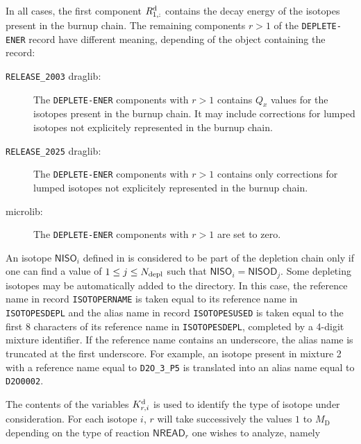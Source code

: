 In all cases, the first component $R_{1,:}^{\rm d}$ contains the decay energy of the isotopes present in the burnup chain. The remaining components $r>1$ of the {\tt DEPLETE-ENER} record have different meaning, depending of the object containing the record:
\begin{description}
\item[{\tt RELEASE\_2003} draglib:] The {\tt DEPLETE-ENER} components with $r>1$ contains $Q_x$ values for the isotopes present in the burnup chain. It may include corrections for lumped isotopes not explicitely represented in the burnup chain.
\item[{\tt RELEASE\_2025} draglib:] The {\tt DEPLETE-ENER} components with $r>1$ contains only corrections for lumped isotopes not explicitely represented in the burnup chain.
\item[microlib:] The {\tt DEPLETE-ENER} components with $r>1$ are set to zero.
\end{description}

An isotope $\mathsf{NISO}_{i}$ defined in  is considered
to be part of the depletion chain only if one can find a value of $1 \le j \le N_{\rm depl}$
such that $\mathsf{NISO}_{i}= \mathsf{NISOD}_{j}$.
Some depleting isotopes may be automatically added to the  directory.
In this case, the reference name in record {\tt ISOTOPERNAME} is taken equal
to its reference name in {\tt ISOTOPESDEPL} and the alias name in record
{\tt ISOTOPESUSED} is taken equal to the
first 8 characters of its reference name in {\tt ISOTOPESDEPL}, completed by a
4-digit mixture identifier. If the reference name contains an underscore, the
alias name is truncated at the first underscore. For example, an isotope
present in mixture 2 with a reference name equal to {\tt D2O\_3\_P5} is
translated into an alias name equal to {\tt D2O0002}.

\vskip 0.2cm

The contents of the variables $K_{r,i}^{\rm d}$ is used to identify the type of isotope under
consideration. For each isotope $i$, $r$ will take
successively the values $1$ to $M_{\mathrm{D}}$ depending on the type of
reaction $\mathsf{NREAD}_{r}$ one wishes to analyze, namely

\vskip 0.2cm

